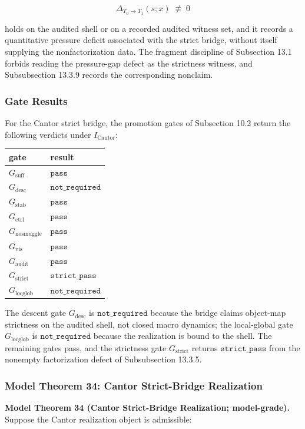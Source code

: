 \documentclass[11pt]{article}
\theoremstyle{definition}
\begin{document}
\[
\Delta_{T_0\to T_1}(s;x)\;\not\equiv\;0
\]

holds on the audited shell or on a recorded audited witness set, and it records a quantitative pressure deficit associated with the strict bridge, without itself supplying the nonfactorization data. The fragment discipline of Subsection 13.1 forbids reading the pressure-gap defect as the strictness witness, and Subsubsection 13.3.9 records the corresponding nonclaim.

\subsubsection{Gate Results}

For the Cantor strict bridge, the promotion gates of Subsection 10.2 return the following verdicts under \(I_{\mathrm{Cantor}}\):

\begin{longtable}[]{@{}ll@{}}
\toprule
gate & result\tabularnewline
\midrule
\endhead
\(G_{\mathrm{suff}}\) & \(\texttt{pass}\)\tabularnewline
\(G_{\mathrm{desc}}\) & \(\texttt{not\_required}\)\tabularnewline
\(G_{\mathrm{stab}}\) & \(\texttt{pass}\)\tabularnewline
\(G_{\mathrm{ctrl}}\) & \(\texttt{pass}\)\tabularnewline
\(G_{\mathrm{nosmuggle}}\) & \(\texttt{pass}\)\tabularnewline
\(G_{\mathrm{vis}}\) & \(\texttt{pass}\)\tabularnewline
\(G_{\mathrm{audit}}\) & \(\texttt{pass}\)\tabularnewline
\(G_{\mathrm{strict}}\) & \(\texttt{strict\_pass}\)\tabularnewline
\(G_{\mathrm{locglob}}\) & \(\texttt{not\_required}\)\tabularnewline
\bottomrule
\end{longtable}

The descent gate \(G_{\mathrm{desc}}\) is \(\texttt{not\_required}\) because the bridge claims object-map strictness on the audited shell, not closed macro dynamics; the local-global gate \(G_{\mathrm{locglob}}\) is \(\texttt{not\_required}\) because the realization is bound to the shell. The remaining gates pass, and the strictness gate \(G_{\mathrm{strict}}\) returns \(\texttt{strict\_pass}\) from the nonempty factorization defect of Subsubsection 13.3.5.

\subsubsection{Model Theorem 34: Cantor Strict-Bridge Realization}

\textbf{Model Theorem 34 (Cantor Strict-Bridge Realization; model-grade).} Suppose the Cantor realization object is admissible:
\end{document}
